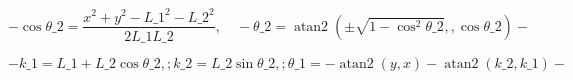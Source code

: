 \documentclass{article}
\begin{document}
\[
- \cos\theta\_2 = \frac{x^2 + y^2 - L\_1^2 - L\_2^2}{2L\_1L\_2},\quad
- \theta\_2 = \operatorname{atan2}(\pm\sqrt{1-\cos^2\theta\_2},,\cos\theta\_2)
- \]
\pagebreak

\[
- k\_1 = L\_1 + L\_2\cos\theta\_2,; k\_2 = L\_2\sin\theta\_2,;\theta\_1 =
- \operatorname{atan2}(y,x) - \operatorname{atan2}(k\_2,k\_1)
- \]
\pagebreak
\end{document}
